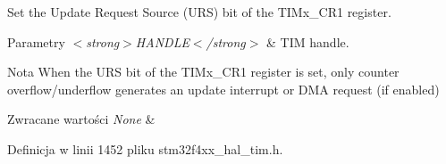 Set the Update Request Source (U\+RS) bit of the T\+I\+Mx\+\_\+\+C\+R1 register. 


\begin{DoxyParams}{Parametry}
{\em $<$strong$>$\+H\+A\+N\+D\+L\+E$<$/strong$>$} & T\+IM handle. \\
\hline
\end{DoxyParams}
\begin{DoxyNote}{Nota}
When the U\+RS bit of the T\+I\+Mx\+\_\+\+C\+R1 register is set, only counter overflow/underflow generates an update interrupt or D\+MA request (if enabled) 
\end{DoxyNote}

\begin{DoxyRetVals}{Zwracane wartości}
{\em None} & \\
\hline
\end{DoxyRetVals}


Definicja w linii 1452 pliku stm32f4xx\+\_\+hal\+\_\+tim.\+h.

